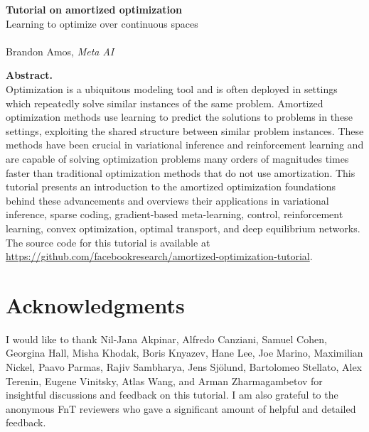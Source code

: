 \documentclass[oneside,11pt]{book}
\begin{document}
\begin{titlepage}
\thispagestyle{empty}
\begin{center}
\textbf{\Large Tutorial on amortized optimization} \\
{\large Learning to optimize over continuous spaces} \\~\\
Brandon Amos, \emph{Meta AI}
\end{center}

\vspace{0.9cm}
\noindent\textbf{Abstract.} \\
Optimization is a ubiquitous modeling tool and is often
deployed in settings which repeatedly solve similar
instances of the same problem.
Amortized optimization methods use learning to predict the solutions to
problems in these settings, exploiting the shared structure
between similar problem instances.
These methods have been crucial in variational inference
and reinforcement learning and are capable of solving
optimization problems many orders of magnitudes times faster
than traditional optimization methods that do not use amortization.
This tutorial presents an introduction to the amortized optimization
foundations behind these advancements and overviews
their applications in variational inference, sparse coding,
gradient-based meta-learning, control, reinforcement learning,
convex optimization, optimal transport, and deep equilibrium networks.
The source code for this tutorial is available at
{\footnotesize\url{https://github.com/facebookresearch/amortized-optimization-tutorial}}.
\end{titlepage}

\setcounter{tocdepth}{1}
\tableofcontents







\newpage
\section*{Acknowledgments}
I would like to thank
Nil-Jana Akpinar,
Alfredo Canziani,
Samuel Cohen,
Georgina Hall,
Misha Khodak,
Boris Knyazev,
Hane Lee,
Joe Marino,
Maximilian Nickel,
Paavo Parmas,
Rajiv Sambharya,
Jens Sj\"olund,
Bartolomeo Stellato,
Alex Terenin,
Eugene Vinitsky,
Atlas Wang,
and
Arman Zharmagambetov
for insightful discussions
and feedback on this tutorial.
I am also grateful to the anonymous FnT reviewers
who gave a significant amount of helpful and
detailed feedback.

{\footnotesize}
\end{document}
